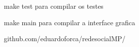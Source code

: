 make test para compilar os testes

make main para compilar a interface grafica

github.\+com/eduardoforca/redesocial\+M\+P/ 